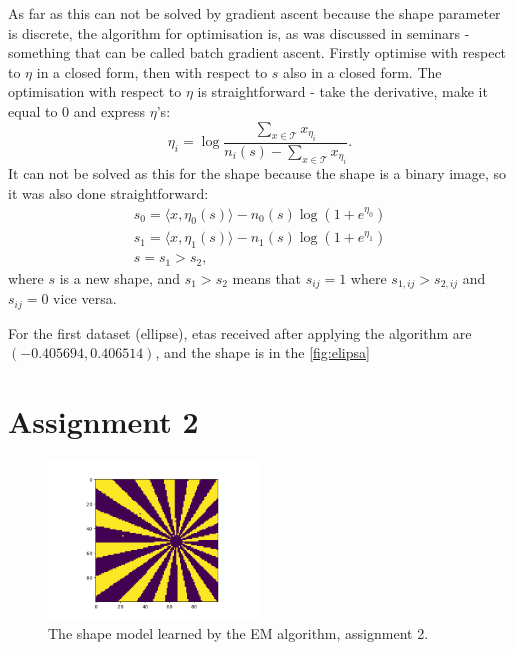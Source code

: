 \documentclass[10pt]{article}
\begin{document}
As far as this can not be solved by gradient ascent because the shape parameter is discrete,
the algorithm for optimisation is, as was discussed in seminars - something that can be called batch gradient ascent.
Firstly optimise with respect to $\eta$ in a closed form, then with respect to $s$ also in a closed form.
The optimisation with respect to $\eta$ is straightforward - take the derivative, make it equal to 0 and express $\eta$'s:
\begin{equation}
    \eta_i = \log \frac{ \sum_{x \in \mathcal{T}} {x_{\eta_i}}}{n_i(s) - \sum_{x \in \mathcal{T}} x_{\eta_i}}.
\end{equation}
It can not be solved as this for the shape because the shape is a binary image, so it was also done straightforward:
\begin{equation}
    \begin{aligned}
        s_0 =  \langle x, \eta_0(s) \rangle - n_0(s)\log(1 + e^{\eta_0}) \\
        s_1 =  \langle x, \eta_1(s) \rangle - n_1(s)\log(1 + e^{\eta_1}) \\
        s = s_1 > s_2,
    \end{aligned}
\end{equation}
where $s$ is a new shape, and $s_1 > s_2$ means that $s_{ij} = 1$ where $s_{1, ij} > s_{2, ij}$ and $s_{ij} = 0$ vice versa.

For the first dataset (ellipse), etas received after applying the algorithm are $(-0.405694, 0.406514)$, and the shape is in the \autoref{fig:elipsa}

\section{Assignment 2}
\label{sec:ass2}

\begin{figure}[H]
  \begin{center}
      \includegraphics[width=0.5\textwidth]{fig/sun.png}
  \end{center}
      \caption{The shape model learned by the EM algorithm, assignment 2.}
      \label{fig:elipsa}
\end{figure}
\end{document}
